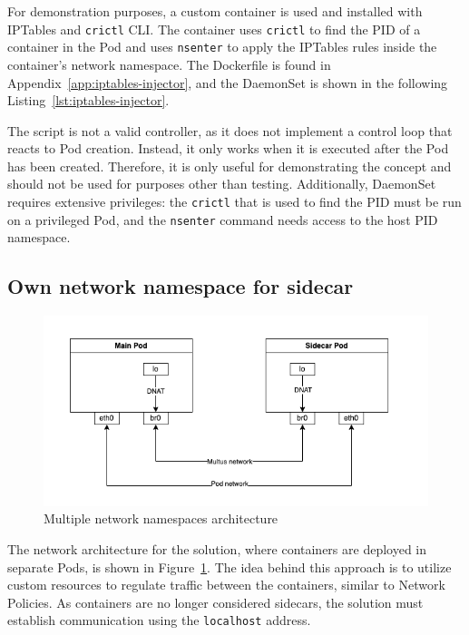\documentclass[english, 12pt, a4paper, sci, utf8, a-2b, online]{aaltothesis}
\begin{document}
For demonstration purposes, a custom container is used and installed with IPTables and \lstinline{crictl} CLI.
The container uses \lstinline{crictl} to find the PID of a container in the Pod and uses \lstinline{nsenter} to apply the IPTables rules inside the container's network namespace.
The Dockerfile is found in Appendix~\ref{app:iptables-injector}, and the DaemonSet is shown in the following Listing~\ref{lst:iptables-injector}.



The script is not a valid controller, as it does not implement a control loop that reacts to Pod creation.
Instead, it only works when it is executed after the Pod has been created.
Therefore, it is only useful for demonstrating the concept and should not be used for purposes other than testing.
Additionally, DaemonSet requires extensive privileges: the \lstinline{crictl} that is used to find the PID must be run on a privileged Pod, and the \lstinline{nsenter} command needs access to the host PID namespace.

\subsection{Own network namespace for sidecar}

\begin{figure}[h!]
  \centering
  \includegraphics[width=\linewidth]{files/multus.png}
  \caption{Multiple network namespaces architecture}
  \label{fig:multi-pod-net-solution}
\end{figure}

The network architecture for the solution, where containers are deployed in separate Pods, is shown in Figure~\ref{fig:multi-pod-net-solution}.
The idea behind this approach is to utilize custom resources to regulate traffic between the containers, similar to Network Policies.
As containers are no longer considered sidecars, the solution must establish communication using the \lstinline{localhost} address.
\end{document}
